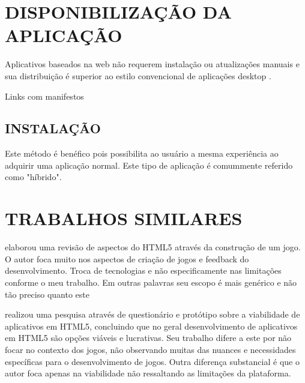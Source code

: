 \section{DISPONIBILIZAÇÃO DA APLICAÇÃO}
\begin{draft}
Aplicativos baseados na web não requerem instalação ou atualizações
manuais e sua distribuição é superior ao estilo convencional de
aplicações desktop \autocite{browserGamesTechnologyAndFuture}.

Links com manifestos


\subsection{INSTALAÇÃO}
Este método é benéfico pois possibilita ao usuário a mesma
experiência ao adquirir uma aplicação normal. Este tipo de
aplicação é comummente referido como "híbrido".

\end{draft}
\section{TRABALHOS SIMILARES}
\cite{crossPlatformMobileGame} elaborou uma revisão de aspectos do
HTML5 através da construção de um jogo. O autor foca muito nos
aspectos de criação de jogos e feedback do desenvolvimento. Troca
de tecnologias e não especificamente nas limitações conforme o meu
trabalho. Em outras palavras seu escopo é mais genérico e não tão
preciso quanto este

\cite{aSeriousContender} realizou uma pesquisa através de questionário
e protótipo sobre a viabilidade de aplicativos em HTML5, concluindo que
no geral desenvolvimento de aplicativos em HTML5 são opções viáveis
e lucrativas. Seu trabalho difere a este por não focar no contexto dos
jogos, não observando muitas das nuances e necessidades específicas
para o desenvolvimento de jogos. Outra diferença substancial é que o autor foca apenas na viabilidade não ressaltando as limitações da plataforma.
